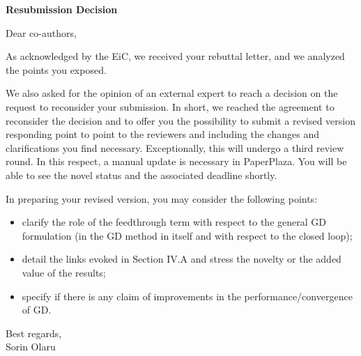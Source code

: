 \thispagestyle{empty}
\setcounter{page}{0}
\begin{center}
    {\LARGE\textbf{Resubmission Decision}}
\end{center}
\begin{flushleft}
    Dear co-authors,

    As acknowledged by the EiC, we received your rebuttal letter, and we analyzed the points you exposed.

    We also asked for the opinion of an external expert to reach a decision on the request to reconsider your submission. In short, we reached the agreement to reconsider the decision and to offer you the possibility to submit a revised version responding point to point to the reviewers and including the changes and clarifications you find necessary. Exceptionally, this will undergo a third review round. In this respect, a manual update is necessary in PaperPlaza. You will be able to see the novel status and the associated deadline shortly. 

    In preparing your revised version, you may consider the following points:
    \begin{itemize}
        \item{%
            clarify the role of the feedthrough term with respect to the general GD formulation (in the GD method in itself and with respect to the closed loop);
        }%
        \item{%
            detail the links evoked in Section IV.A and stress the novelty or the added value of the results; 
        }%
        \item{%
            specify if there is any claim of improvements in the performance/convergence of GD.
        }%
    \end{itemize}

    Best regards,\\[1em]%
    Sorin Olaru
\end{flushleft}
\newpage